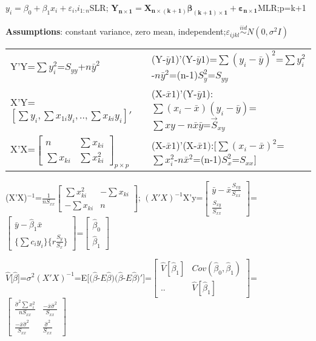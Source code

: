 \documentclass[
  10pt,
  twocolumn]{article}
\author{}
\date{\vspace{-2.5em}}
\begin{document}
\pagecolor{black}
\color{white}

\fontsize{6pt}{0pt}

\footnotesize

\(y_i=\beta_0+\beta_1x_i+\varepsilon_i\),\(i_{1:n}\)SLR;
\(\mathbf{Y_{n\times1}}=\mathbf{X_{n\times (k+1)}}\boldsymbol{\beta_{(k+1)\times1}}+\boldsymbol{\varepsilon_{n\times1}}\)MLR;p=k+1

\textbf{Assumptions}: constant variance, zero mean,
independent;\(\varepsilon_{ijkl}\overset{iid}{\sim}N(0,\sigma^2I)\)

\begin{tabular}{l|l}\hline
Y'Y=$\sum y_i^2$=$S_{yy}$+$n\bar y^2$& (Y-$\bar y1$)'(Y-$\bar y1)$=$\sum(y_i-\bar y)^2$=$\sum y_i^2$-$n\bar y^2$=(n-1)$S_y^2$=$S_{yy}$\\
X'Y=$[\sum y_i,\sum x_{1i}y_i,..,\sum x_{ki}y_i]'$&(X-$\bar x1$)'(Y-$\bar y1$):$\sum(x_i-\bar x)(y_i-\bar y)$=$\sum xy-n\bar x\bar y$=$\vec S_{xy}$\\
X'X=$\begin{bmatrix} n&\sum x_{ki} \\ \sum x_{ki}&\sum x_{ki}^2\end{bmatrix}_{p\times p}$& (X-$\bar x1$)'(X-$\bar x1)$:$[\sum(x_i-\bar x)^2$=$\sum x_i^2$-$n\bar x^2$=(n-1)$S_x^2$=$S_{xx}]$\\\hline
\end{tabular}

(X'X)\(^{-1}\)=\(\frac{1}{nS_{xx}}\begin{bmatrix} \sum x_{ki}^2&-\sum x_{ki}\\ -\sum x_{ki}&n\end{bmatrix}\);
\((X'X)^{-1}\)X'y=\(\begin{bmatrix} \bar y-\bar x\frac{S_{xy}}{S_{xx}}\\ \frac{S_{xy}}{S_{xx}}\end{bmatrix}\)=\(\begin{bmatrix} \bar y-\hat\beta_1\bar x\\ \{\sum c_iy_i\}\{r\frac{S_y}{S_x}\}\end{bmatrix}\)=\(\begin{bmatrix} \hat\beta_0\\ \hat\beta_1\end{bmatrix}\)

\(\hat V[\hat\beta\){]}=\(\sigma^2(X'X)^{-1}\)=E{[}\((\hat\beta\)-\(E\hat\beta)(\hat\beta\)-\(E\hat\beta)'\){]}=\(\begin{bmatrix} \hat V[\hat\beta_1]&Cov(\hat\beta_0,\hat\beta_1)\\ ..&\hat V[\hat\beta_1]\end{bmatrix}\)=\(\begin{bmatrix} \frac{\hat\sigma^2\sum x_{i}^2}{nS_{xx}}&\frac{-\bar x\hat\sigma^2}{S_{xx}}\\ \frac{-\bar x\hat\sigma^2}{S_{xx}}&\frac{\hat\sigma^2}{S_{xx}}\end{bmatrix}\)
\end{document}
